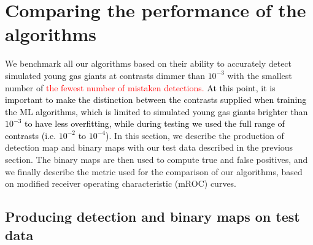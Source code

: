 \documentclass{aa}
\newcommand{\newchange}[1]{\textcolor{black}{#1}}
\begin{document}
\section{Comparing the performance of the algorithms}\label{sec:results}

We benchmark all our algorithms based on their ability to accurately detect simulated \newchange{young gas giant}s at contrasts dimmer than $10^{-3}$ with the smallest number of \textcolor{red}{the fewest number of mistaken detections.}
\newchange{At this point, it is important to make the distinction between the contrasts supplied when training the ML algorithms, which  is limited to simulated young gas giants brighter than $10^{-3}$ to have less overfitting, while during testing we used the full range of contrasts (i.e. $10^{-2}$ to $10^{-4}$).}
In this section, we describe the production of detection map and binary maps with our test data described in the previous section.
The binary maps are then used to compute true and false positives, and we finally describe the metric used for the comparison of our algorithms, based on modified receiver operating characteristic (mROC) curves.


\subsection{Producing detection and binary maps on test data}\label{sec:testdata}
\end{document}
